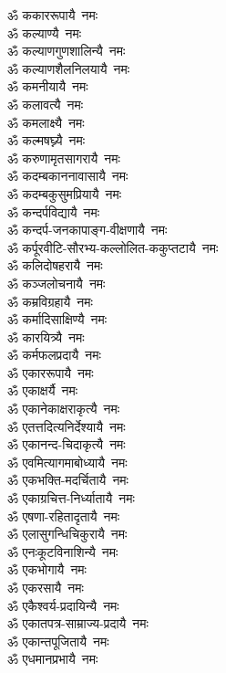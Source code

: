 \begin{multicols}{2}
\begin{flushleft}
ॐ ककाररूपायै~नमः\\
ॐ कल्याण्यै~नमः\\
ॐ कल्याणगुणशालिन्यै~नमः\\
ॐ कल्याणशैलनिलयायै~नमः\\
ॐ कमनीयायै~नमः\\
ॐ कलावत्यै~नमः\\
ॐ कमलाक्ष्यै~नमः\\
ॐ कल्मषघ्न्यै~नमः\\
ॐ करुणामृतसागरायै~नमः\\
ॐ कदम्बकाननावासायै~नमः\hfill {}\\
ॐ कदम्बकुसुमप्रियायै~नमः\\
ॐ कन्दर्पविद्यायै~नमः\\
ॐ कन्दर्प-जनकापाङ्ग-वीक्षणायै~नमः\\
ॐ कर्पूरवीटि-सौरभ्य-कल्लोलित-ककुप्तटायै~नमः\\
ॐ कलिदोषहरायै~नमः\\
ॐ कञ्जलोचनायै~नमः\\
ॐ कम्रविग्रहायै~नमः\\
ॐ कर्मादिसाक्षिण्यै~नमः\\
ॐ कारयित्र्यै~नमः\\
ॐ कर्मफलप्रदायै~नमः\hfill {}\\
ॐ एकाररूपायै~नमः\\
ॐ एकाक्षर्यै~नमः\\
ॐ एकानेकाक्षराकृत्यै~नमः\\
ॐ एतत्तदित्यनिर्देश्यायै~नमः\\
ॐ एकानन्द-चिदाकृत्यै~नमः\\
ॐ एवमित्यागमाबोध्यायै~नमः\\
ॐ एकभक्ति-मदर्चितायै~नमः\\
ॐ एकाग्रचित्त-निर्ध्यातायै~नमः\\
ॐ एषणा-रहितादृतायै~नमः\\
ॐ एलासुगन्धिचिकुरायै~नमः\hfill {}\\
ॐ एनःकूटविनाशिन्यै~नमः\\
ॐ एकभोगायै~नमः\\
ॐ एकरसायै~नमः\\
ॐ एकैश्वर्य-प्रदायिन्यै~नमः\\
ॐ एकातपत्र-साम्राज्य-प्रदायै~नमः\\
ॐ एकान्तपूजितायै~नमः\\
ॐ एधमानप्रभायै~नमः\\

\end{flushleft}
\end{multicols}
